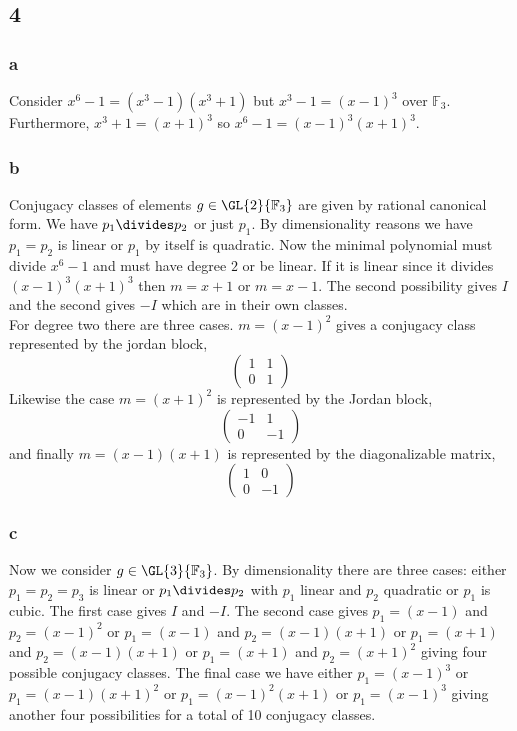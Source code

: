 \documentclass[12pt]{article}
\renewcommand{\F}{\mathbb{F}}
\begin{document}
\subsection{4}

\subsubsection{a}

Consider $x^6 - 1 = (x^3 - 1)(x^3 + 1)$ but $x^3 - 1 = (x - 1)^3$ over $\F_3$. Furthermore, $x^3 + 1 = (x + 1)^3$ so $x^6 - 1 = (x - 1)^3(x + 1)^3$.

\subsubsection{b}

Conjugacy classes of elements $g \in \GL{2}{\F_3}$ are given by rational canonical form. We have $p_1 \divides p_2$ or just $p_1$. By dimensionality reasons we have $p_1 = p_2$ is linear or $p_1$ by itself is quadratic. Now the minimal polynomial must divide $x^6 - 1$ and must have degree $2$ or be linear. If it is linear since it divides $(x - 1)^3 (x + 1)^3$ then $m = x + 1$ or $m = x - 1$. The second possibility gives $I$ and the second gives $-I$ which are in their own classes. 
\bigskip\\
For degree two there are three cases. $m = (x - 1)^2$ gives a conjugacy class represented by the jordan block,
\[ 
\begin{pmatrix}
1 & 1 
\\
0 & 1
\end{pmatrix}
\]
Likewise the case $m = (x + 1)^2$ is represented by the Jordan block,
\[
\begin{pmatrix}
-1 & 1
\\
0 & - 1
\end{pmatrix}
\]
and finally $m = (x - 1)(x + 1)$ is represented by the diagonalizable matrix,
\[ 
\begin{pmatrix}
1 & 0
\\
0 & -1
\end{pmatrix}
\] 

\subsubsection{c}

Now we consider $g \in \GL{3}{\F_3}$. By dimensionality there are three cases: either $p_1 = p_2 = p_3$ is linear or $p_1 \divides p_2$ with $p_1$ linear and $p_2$ quadratic or $p_1$ is cubic. The first case gives $I$ and $-I$. The second case gives $p_1 = (x - 1)$ and $p_2 = (x - 1)^2$ or $p_1 = (x-1)$ and $p_2 = (x-1)(x+1)$ or $p_1 = (x + 1)$ and $p_2 = (x - 1)(x + 1)$ or $p_1 = (x + 1)$ and $p_2 = (x + 1)^2$ giving four possible conjugacy classes. The final case we have either $p_1 = (x-1)^3$ or $p_1 = (x-1)(x+1)^2$ or $p_1 = (x-1)^2 (x+1)$ or $p_1 = (x-1)^3$ giving another four possibilities for a total of 10 conjugacy classes.
\end{document}
